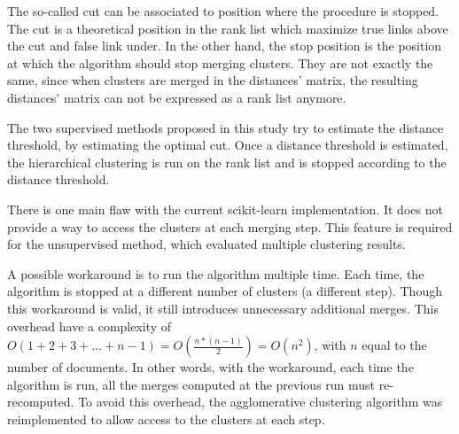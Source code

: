 The so-called cut can be associated to position where the procedure is stopped.
The cut is a theoretical position in the rank list which maximize true links above the cut and false link under.
In the other hand, the stop position is the position at which the algorithm should stop merging clusters.
They are not exactly the same, since when clusters are merged in the distances' matrix, the resulting distances' matrix can not be expressed as a rank list anymore.

The two supervised methods proposed in this study try to estimate the distance threshold, by estimating the optimal cut.
Once a distance threshold is estimated, the hierarchical clustering is run on the rank list and is stopped according to the distance threshold.

There is one main flaw with the current scikit-learn implementation.
It does not provide a way to access the clusters at each merging step.
This feature is required for the unsupervised method, which evaluated multiple clustering results.

A possible workaround is to run the algorithm multiple time.
Each time, the algorithm is stopped at a different number of clusters (a different step).
Though this workaround is valid, it still introduces unnecessary additional merges.
This overhead have a complexity of $O(1 + 2 + 3 + ... + n - 1) = O(\frac{n * (n - 1)}{2}) = O(n^2)$, with $n$ equal to the number of documents.
In other words, with the workaround, each time the algorithm is run, all the merges computed at the previous run must re-recomputed.
To avoid this overhead, the agglomerative clustering algorithm was reimplemented to allow access to the clusters at each step.

